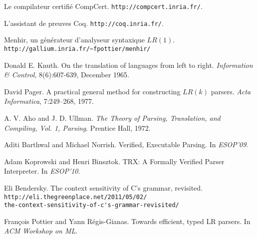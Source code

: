 \documentclass[a4paper,11pt]{article}
\begin{document}
\begin{thebibliography}{99}

  Le compilateur certifié CompCert.
  \verb+http://compcert.inria.fr/+.

  L'assistant de preuves Coq.
  \verb+http://coq.inria.fr/+.

  Menhir, un générateur d'analyseur syntaxique $LR(1)$.
  \verb+http://gallium.inria.fr/~fpottier/menhir/+

  Donald E. Knuth.
  On the translation of languages from left to right.
  \emph{Information \& Control}, 8(6):607-639, December 1965.

  David Pager.
  A practical general method for constructing $LR(k)$ parsers.
  \emph{Acta Informatica}, 7:249–268, 1977.

  A. V. Aho and J. D. Ullman.
  \emph{The Theory of Parsing, Translation, and Compiling, Vol. 1,
    Parsing}.
  Prentice Hall, 1972.

  Aditi Barthwal and Michael Norrish.
  Verified, Executable Parsing.
  In \emph{ESOP'09}.

  Adam Koprowski and Henri Binsztok.
  TRX: A Formally Verified Parser Interpreter.
  In \emph{ESOP'10}.

  Eli Bendersky.
  The context sensitivity of C’s grammar, revisited.\\
  \verb+http://eli.thegreenplace.net/2011/05/02/+\\\verb+the-context-sensitivity-of-c's-grammar-revisited/+

  François Pottier and Yann Régis-Gianas.
  Towards efficient, typed LR parsers.
  In \emph{ACM Workshop on ML}.

\end{thebibliography}
\end{document}

